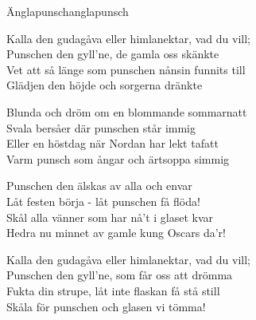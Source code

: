 \begin{song}{Änglapunsch}{anglapunsch}
\begin{vers}
Kalla den gudagåva eller himlanektar, vad du vill;\\
Punschen den gyll'ne, de gamla oss skänkte\\
Vet att så länge som punschen nånsin funnits till\\
Glädjen den höjde och sorgerna dränkte\\
\end{vers}
\begin{vers}
Blunda och dröm om en blommande sommarnatt\\
Svala bersåer där punschen står immig\\
Eller en höstdag när Nordan har lekt tafatt\\
Varm punsch som ångar och ärtsoppa simmig\\
\end{vers}
\begin{vers}
Punschen den älskas av alla och envar\\
Låt festen börja - låt punschen få flöda!\\
Skål alla vänner som har nå't i glaset kvar\\
Hedra nu minnet av gamle kung Oscars da'r!\\
\end{vers}
\begin{vers}
Kalla den gudagåva eller himlanektar, vad du vill;\\
Punschen den gyll'ne, som får oss att drömma\\
Fukta din strupe, låt inte flaskan få stå still\\
Skåla för punschen och glasen vi tömma!\\
\end{vers}
\end{song}
